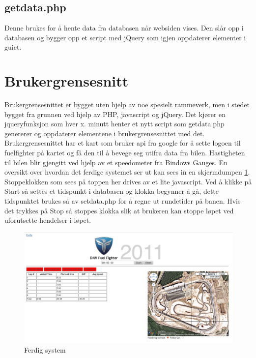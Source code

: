 \subsection{getdata.php}
Denne brukes for å hente data fra databasen når websiden vises. Den slår opp i databasen og bygger opp et script med jQuery\cite{jquery} som igjen oppdaterer elementer i guiet.
\section{Brukergrensesnitt}
Brukergrensesnittet er bygget uten hjelp av noe spesielt rammeverk, men i stedet bygget fra grunnen ved hjelp av PHP, javascript og jQuery\cite{jquery}. Det kjører en jqueryfunksjon som hver x. minutt henter et nytt script som getdata.php genererer og oppdaterer elementene i brukergrensesnittet med det. Brukergrensesnittet har et kart som bruker api fra google for å sette logoen til fuelfighter på kartet og få den til å bevege seg utifra data fra bilen. Hastigheten til bilen blir gjengitt ved hjelp av et speedometer fra Bindows Gauges\cite{bindows}. En oversikt over hvordan det ferdige systemet ser ut kan sees in en skjermdumpen \ref{gui}. Stoppeklokken som sees på toppen her drives av et lite javascript. Ved å klikke på Start så settes et tidspunkt i databasen og klokka begynner å gå, dette tidspunktet brukes så av setdata.php for å regne ut rundetider på banen. Hvis det trykkes på Stop så stoppes klokka slik at brukeren kan stoppe løpet ved uforutsette hendelser i løpet.
\begin{figure}[H]
\caption{Ferdig system} 
\label{gui}
\includegraphics[width=\textwidth]{images/gui.png}
\end{figure}
